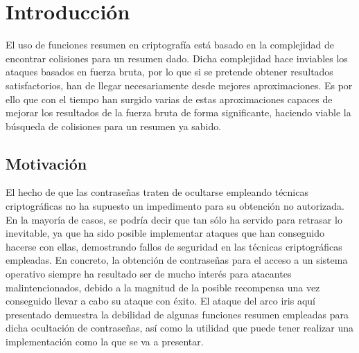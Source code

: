 \documentclass[12pt,spanish,listoffigures,listoftables]{tfgetsinf}
\begin{document}

\mainmatter


\chapter{Introducci\'on}

El uso de funciones resumen en criptografía está basado en la complejidad de encontrar colisiones para un resumen dado. Dicha complejidad hace inviables los ataques basados en fuerza bruta, por lo que si se pretende obtener resultados satisfactorios, han de llegar necesariamente desde mejores aproximaciones. Es por ello que con el tiempo han surgido varias de estas aproximaciones capaces de mejorar los resultados de la fuerza bruta de forma significante, haciendo viable la búsqueda de colisiones para un resumen ya sabido.
~\\

\section{Motivaci\'on}

El hecho de que las contraseñas traten de ocultarse empleando técnicas criptográficas no ha supuesto un impedimento para su obtención no autorizada. En la mayoría de casos, se podría decir que tan sólo ha servido para retrasar lo inevitable, ya que ha sido posible implementar ataques que han conseguido hacerse con ellas, demostrando fallos de seguridad en las técnicas criptográficas empleadas. En concreto, la obtención de contraseñas para el acceso a un sistema operativo siempre ha resultado ser de mucho interés para atacantes malintencionados, debido a la magnitud de la posible recompensa una vez conseguido llevar a cabo su ataque con éxito. El ataque del arco iris aquí presentado demuestra la debilidad de algunas funciones resumen empleadas para dicha ocultación de contraseñas, así como la utilidad que puede tener realizar una implementación como la que se va a presentar.
~\\
\end{document}

